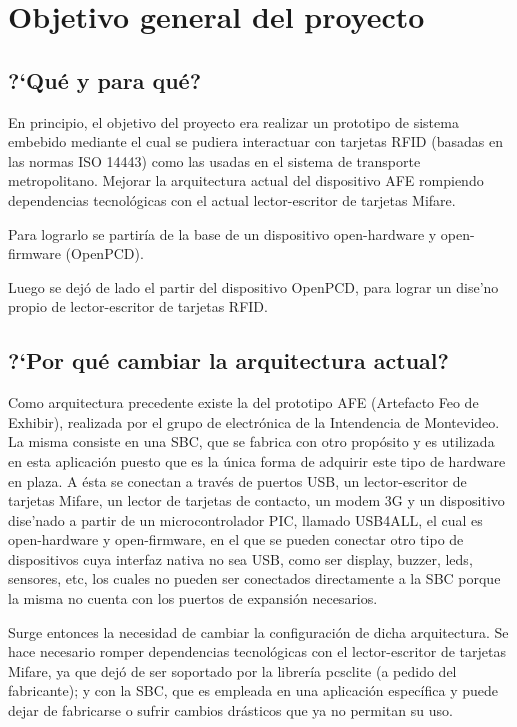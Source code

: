 \chapter{Objetivo general del proyecto}

\section{?`Qu\'e y para qu\'e?}

En principio, el objetivo del proyecto era realizar un prototipo de sistema embebido mediante el cual se pudiera interactuar con tarjetas RFID (basadas en las normas ISO 14443) como las usadas en el sistema de transporte metropolitano.
Mejorar la arquitectura actual del dispositivo AFE rompiendo dependencias tecnol\'ogicas con el actual lector-escritor de tarjetas Mifare.

Para lograrlo se partir\'ia de la base de un dispositivo open-hardware y open-firmware (OpenPCD).

Luego se dej\'o de lado el partir del dispositivo OpenPCD, para lograr un dise'no propio de lector-escritor de tarjetas RFID.

\section{?`Por qu\'e cambiar la arquitectura actual?}

Como arquitectura precedente existe la del prototipo AFE (Artefacto Feo de Exhibir), realizada por el grupo de electr\'onica de la Intendencia de Montevideo. La misma consiste en una SBC, que se fabrica con otro prop\'osito y es utilizada en esta aplicaci\'on puesto que es la \'unica forma de adquirir este tipo de hardware en plaza. A \'esta se conectan a trav\'es de puertos USB, un lector-escritor de tarjetas Mifare, un lector de tarjetas de contacto, un modem 3G y un dispositivo dise'nado a partir de un microcontrolador PIC, llamado USB4ALL, el cual es open-hardware y open-firmware, en el que se pueden conectar otro tipo de dispositivos cuya interfaz nativa no sea USB, como ser display, buzzer, leds, sensores, etc, los cuales no pueden ser conectados directamente a la SBC porque la misma no cuenta con los puertos de expansi\'on necesarios.

Surge entonces la necesidad de cambiar la configuraci\'on de dicha arquitectura. Se hace necesario romper dependencias tecnol\'ogicas con el lector-escritor de tarjetas Mifare, ya que dej\'o de ser soportado por la librer\'ia pcsclite (a pedido del fabricante); y con la SBC, que es empleada en una aplicaci\'on espec\'ifica y puede dejar de fabricarse o sufrir cambios dr\'asticos que ya no permitan su uso.


